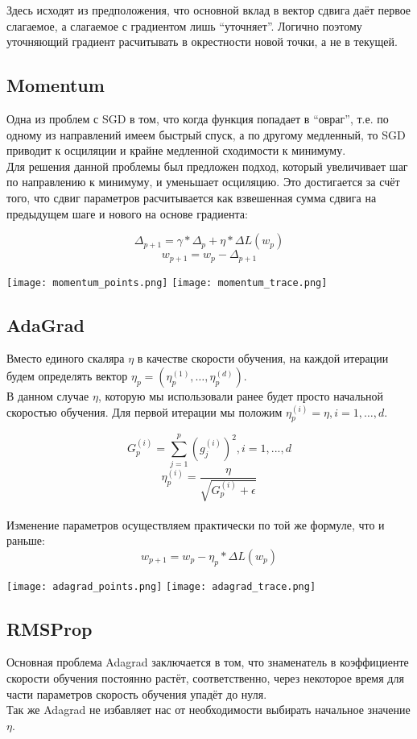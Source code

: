 \documentclass{article}
\begin{document}
Здесь исходят из предположения, что основной вклад в вектор сдвига даёт первое слагаемое, а слагаемое с градиентом лишь “уточняет”. Логично поэтому уточняющий градиент расчитывать в окрестности новой точки, а не в текущей.

\subsection{Momentum}
Одна из проблем с SGD в том, что когда функция попадает в “овраг”, т.е. по одному из направлений имеем быстрый спуск, а по другому медленный, то SGD приводит к осциляции и крайне медленной сходимости к минимуму. \\
Для решения данной проблемы был предложен подход, который увеличивает шаг по направлению к минимуму, и уменьшает осциляцию. Это достигается за счёт того, что сдвиг параметров расчитывается как взвешенная сумма сдвига на предыдущем шаге и нового на основе градиента:

$$\Delta_{p + 1} = \gamma * \Delta_p + \eta *\Delta L(w_p)$$
$$w_{p + 1} = w_p-\Delta_{p+1}$$

\texttt{[image: momentum\_points.png]}
\texttt{[image: momentum\_trace.png]}

\subsection{AdaGrad}
Вместо единого скаляра $\eta$ в качестве скорости обучения, на каждой итерации будем определять вектор $\eta_p=(\eta^{(1)}_p,…,\eta^{(d)}_p)$. \\
В данном случае $\eta$, которую мы использовали ранее будет просто начальной скоростью обучения. Для первой итерации мы положим $\eta^{(i)}_p=\eta,i=1,…,d$.

$$G^{(i)}_p = \sum_{j=1}^p{(g^{(i)}_j)^2},i=1,...,d$$
$$\eta^{(i)}_p = \frac{\eta}{\sqrt{G^{(i)}_p+\epsilon}}$$ \\

Изменение параметров осуществляем практически по той же формуле, что и раньше:
$$w_{p+1}=w_p−\eta_p * \Delta L(w_p)$$

\texttt{[image: adagrad\_points.png]}
\texttt{[image: adagrad\_trace.png]}

\subsection{RMSProp}
Основная проблема Adagrad заключается в том, что знаменатель в коэффициенте скорости обучения постоянно растёт, соответственно, через некоторое время для части параметров скорость обучения упадёт до нуля. \\
Так же Adagrad не избавляет нас от необходимости выбирать начальное значение $\eta$.
\end{document}
